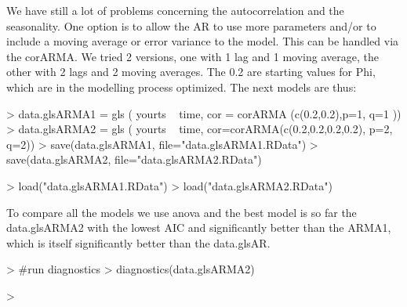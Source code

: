 \documentclass[11pt, a4paper]{article} %
\begin{document}
We have still a lot of problems concerning the autocorrelation and the seasonality. One option is to allow the AR to use more parameters and/or to include a moving average or error variance to the model. This can be handled via the corARMA. We tried 2 versions, one with 1 lag and 1 moving average, the other with 2 lags and 2 moving averages.
The 0.2 are starting values for Phi, which are in the modelling process optimized.
The next models are thus:
\begin{Schunk}
\begin{Sinput}
> data.glsARMA1 = gls ( yourts ~ time, cor = corARMA (c(0.2,0.2),p=1, q=1 ))
> data.glsARMA2 = gls ( yourts ~ time, cor=corARMA(c(0.2,0.2,0.2,0.2), p=2, q=2))
> save(data.glsARMA1, file="data.glsARMA1.RData")
> save(data.glsARMA2, file="data.glsARMA2.RData")
\end{Sinput}
\end{Schunk}

\begin{Schunk}
\begin{Sinput}
> load("data.glsARMA1.RData")
> load("data.glsARMA2.RData")
\end{Sinput}
\end{Schunk}

To compare all the models we use anova and the best model is so far the data.glsARMA2 with the lowest AIC and significantly better than the ARMA1, which is itself significantly better than the data.glsAR.
\begin{Schunk}
\begin{Sinput}
>  #run diagnostics
> diagnostics(data.glsARMA2)
\end{Sinput}
\begin{Sinput}
> 
\end{Sinput}
\end{Schunk}
\end{document}
